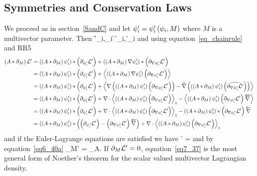 \subsection{Symmetries and Conservation Laws}
We proceed as in section~\ref{SandC} and let $\psi'_{i} = {\psi'_{i}}\left ( {\psi_{i},M} \right )$ where $M$ is a multivector parameter. Then
\be
	\f{\Lf'}{\psi_{i},\nabla\psi_{i}} \equiv \f{\Lf}{\psi'_{i},\nabla\psi'_{i}}
\ee
and using equation~\ref{eq_chainrule} and RR5
\begin{align}
	\left ( {A*\partial_{M}} \right )\mathcal{L}' &= \left ( {\left ( {A*\partial_{M}} \right )\psi'_{i}} \right )*\left ( {\partial_{\psi'_{i}}\mathcal{L}'} \right )
	                      +\left ( {\left ( {A*\partial_{M}} \right )\nabla\psi'_{i}} \right )*\left ( {\partial_{\nabla\psi'_{i}}\mathcal{L}'} \right ) \nonumber \\
	                   &= \left ( {\left ( {A*\partial_{M}} \right )\psi'_{i}} \right )*\left ( {\partial_{\psi'_{i}}\mathcal{L}'} \right )
	                      +\left \langle {\left ({\left ({A*\partial_{M}} \right )\nabla\psi'_{i}} \right )\left ({\partial_{\nabla\psi'_{i}}\mathcal{L}'} \right )} \right \rangle_{} \nonumber \\
	                   &= \left ( {\left ( {A*\partial_{M}} \right )\psi'_{i}} \right )*\left ( {\partial_{\psi'_{i}}\mathcal{L}'} \right )
	                      +\left \langle {\nabla\left ({\left ({\left ({A*\partial_{M}} \right )\psi'_{i}} \right )\left ({\partial_{\nabla\psi'_{i}}\mathcal{L}'} \right )} \right )-\widehat{\nabla}\left ({\left ({\left ({A*\partial_{M}} \right )\psi'_{i}} \right )\left ({\widehat{\partial_{\nabla\psi'_{i}}\mathcal{L}'}} \right )} \right )} \right \rangle_{} \nonumber \\
	                   &= \left ( {\left ( {A*\partial_{M}} \right )\psi'_{i}} \right )*\left ( {\partial_{\psi'_{i}}\mathcal{L}'} \right )
	                      +\nabla\cdot\left \langle {\left ({\left ({A*\partial_{M}} \right )\psi'_{i}} \right )\left ({\partial_{\nabla\psi'_{i}}\mathcal{L}'} \right )} \right \rangle_{1}
	                      -\left \langle {\left ({\left ({A*\partial_{M}} \right )\psi'_{i}} \right )\left ({\partial_{\nabla\psi'_{i}}\mathcal{L}'} \right )\overleftarrow{\nabla}} \right \rangle_{} \nonumber \\
	                   &= \left ( {\left ( {A*\partial_{M}} \right )\psi'_{i}} \right )*\left ( {\partial_{\psi'_{i}}\mathcal{L}'} \right )
	                      +\nabla\cdot\left \langle {\left ({\left ({A*\partial_{M}} \right )\psi'_{i}} \right )\left ({\partial_{\nabla\psi'_{i}}\mathcal{L}'} \right )} \right \rangle_{1}
	                      -\left ( {\left ( {A*\partial_{M}} \right )\psi'_{i}} \right )*\left ( {\partial_{\nabla\psi'_{i}}\mathcal{L}'} \right )\overleftarrow{\nabla} \nonumber \\
	                   &= \left ( {\left ( {A*\partial_{M}} \right )\psi'_{i}} \right )*\left ( {\left ( {\partial_{\psi'_{i}}\mathcal{L}'} \right )-\left ( {\partial_{\nabla\psi'_{i}}\mathcal{L}'} \right )\overleftarrow{\nabla}} \right )
	                      +\nabla\cdot\left \langle {\left ({\left ({A*\partial_{M}} \right )\psi'_{i}} \right )\left ({\partial_{\nabla\psi'_{i}}\mathcal{L}'} \right )} \right \rangle_{1}
\end{align}
and if the Euler-Lagrange equations are satisfied we have
\be
    \Lf' = \nabla\cdot{}
\ee
and by equation~\ref{eq6_40a}
\be
	\partial_{M}\Lf' = \partial_{A}. \label{eq7_37}
\ee
If $\partial_{M}\mathcal{L}'=0$, equation~\ref{eq7_37} is the most general form of Noether's theorem for the scalar valued multivector Lagrangian density.

